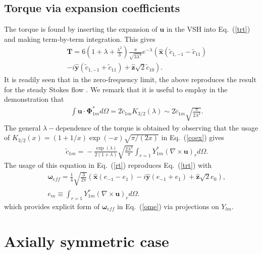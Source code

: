 \documentclass[aps,prx,twocolumn,amsmath,amssymb,amsfonts]{revtex4-2}
\begin{document}
{{\begin{appendices}
\subsection{Torque via expansion coefficients}

The torque is found by inserting the expansion of $\bm u$ in the VSH into Eq.~(\ref{trt}) and making term-by-term integration. This gives
\begin{eqnarray}&&\!\!\!\!\!\!
\bm T\!=\!6 \left(1\!+\!\lambda\!+\!\frac{\lambda^2}{3}\right)\frac{\pi}{\sqrt{3\lambda^3}}e^{-\lambda}\left(\bm{\hat x}({\tilde c}_{1, -1}-{\tilde c}_{11})\!
\right.\nonumber\\&&\!\!\!\!\!\!\left.
- i\bm{\hat y}({\tilde c}_{1, -1}+{\tilde c}_{11})
+\bm{\hat z}\sqrt{2}{\tilde c}_{10}\right). \label{rt}
\end{eqnarray}
It is readily seen that in the zero-frequency limit, the above reproduces the result for the steady Stokes flow \cite{kim}. We remark that it is useful to employ in the demonstration that
\begin{eqnarray}&&\!\!\!\!\!\!
\int \bm u\cdot \bm \Phi_{1m}^* d\Omega\!=\!2{\tilde c}_{1m} K_{3/2}(\lambda)\sim 2{\tilde c}_{1m}\sqrt{\frac{\pi}{2\lambda^3}}. \nonumber
\end{eqnarray}
The general $\lambda-$dependence of the torque is obtained by observing that the usage of $K_{3/2}(x)=(1+1/x)\exp(-x)\sqrt{\pi/(2x)}$ in Eq.~(\ref{coex}) gives
\begin{eqnarray}&&\!\!\!\!\!\!\!\!\!\!\!\!
{\tilde c}_{1m}\!=\!-\frac{\exp(\lambda)}{2(1+\lambda)}\sqrt{\frac{2\lambda^3}{\pi}}\int_{r=1} Y_{1m}^* (\nabla\!\times\! \bm u)_r   d\Omega.
\end{eqnarray}
The usage of this equation in Eq.~(\ref{rt}) reproduces Eq.~(\ref{trt}) with
\begin{eqnarray}&&
\bm  \omega_{eff}\!=\!\frac{1}{4}\sqrt{\frac{3}{2\pi}}\left(\bm{\hat x}(e_{-1}-e_{1})\!- i\bm{\hat y}(e_{-1}+e_{1})
+\bm{\hat z}\sqrt{2}e_{0}\right),
\nonumber\\&&
e_{m}\equiv \int_{r=1} Y_{1m}^* (\nabla\!\times\! \bm u)_r   d\Omega.
\end{eqnarray}
which provides explicit form of $\bm  \omega_{eff}$ in Eq.~(\ref{ome}) via projections on $Y_{lm}$.

\section{Axially symmetric case} \label{as}


\end{appendices}}}
\end{document}
